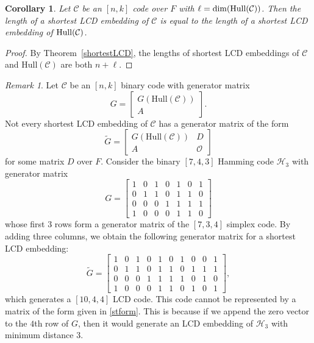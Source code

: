 \documentclass{article}
\newtheorem{corollary}[theorem]{Corollary}
\theoremstyle{definition}
\theoremstyle{remark}
\newtheorem{remark}{Remark}
\begin{document}
\begin{corollary}
    Let $\mathcal{C}$ be an $[n, k]$ code over $F$ with $\ell=\dim({\rm Hull}(\mathcal{C}))$. Then the length of a shortest LCD embedding of $\mathcal{C}$ is equal to the length of a shortest LCD embedding of ${\rm Hull}(\mathcal{C})$.
\end{corollary}
\begin{proof}
    By Theorem~\ref{shortestLCD}, the lengths of shortest LCD embeddings of $\mathcal{C}$ and $\text{Hull}(\mathcal{C})$ are both $n+\ell$.
\end{proof}

\begin{remark}\label{Hamming-743}
    Let $\mathcal{C}$ be an $[n, k]$ binary code with generator matrix
    \[
    G=\begin{bmatrix}
    G(\text{Hull}(\mathcal{C}))\\A
\end{bmatrix}.
    \]
    Not every shortest LCD embedding of $\mathcal{C}$ has a generator matrix of the form
    \begin{equation}\label{stform}
    \tilde{G}=\begin{bmatrix}
    G(\text{Hull}(\mathcal{C})) & D\\A & \mathcal{O}
    \end{bmatrix}
    \end{equation}
    for some matrix $D$ over $F$.
    Consider the binary $[7, 4, 3]$ Hamming code $\mathcal{H}_3$ with generator matrix
    \[
    G=\begin{bmatrix}
        1 & 0 & 1 & 0 & 1 & 0 & 1\\0 & 1 & 1 & 0 & 1 & 1 & 0\\0 & 0 & 0 & 1 & 1 & 1 & 1\\1 & 0 & 0 & 0 & 1 & 1 & 0
    \end{bmatrix}
    \]
    whose first 3 rows form a generator matrix of the $[7, 3, 4]$ simplex code. By adding three columns, we obtain the following generator matrix for a shortest LCD embedding:
    \[
    \tilde{G}=\begin{bmatrix}
        1 & 0 & 1 & 0 & 1 & 0 & 1 & 0 & 0 & 1\\
        0 & 1 & 1 & 0 & 1 & 1 & 0 & 1 & 1 & 1\\
        0 & 0 & 0 & 1 & 1 & 1 & 1 & 0 & 1 & 0\\
        1 & 0 & 0 & 0 & 1 & 1 & 0 & 1 & 0 & 1
    \end{bmatrix},
    \]
    which generates a $[10, 4, 4]$ LCD code. This code cannot be represented by a matrix of the form given in \eqref{stform}. This is because if we append the zero vector to the $4$th row of $G$, then it would generate an LCD embedding of $\mathcal{H}_3$ with minimum distance $3$.
\end{remark}
\end{document}
